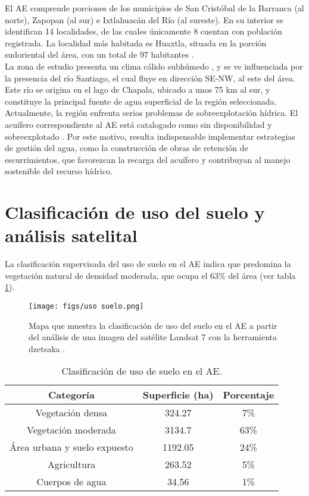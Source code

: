 \documentclass[12pt,letterpaper]{article}
\begin{document}
El AE comprende porciones de los municipios de San Cristóbal de la Barranca (al norte), Zapopan (al sur) e Ixtlahuacán del Río (al sureste). En su interior se identifican 14 localidades, de las cuales únicamente 8 cuentan con población registrada. La localidad más habitada es Huaxtla, situada en la porción sudoriental del área, con un total de 97 habitantes \cite{6}.\\

La zona de estudio presenta un clima cálido subhúmedo \cite{1,2}, y se ve influenciada por la presencia del río Santiago, el cual fluye en dirección SE-NW, al este del área. Este río se origina en el lago de Chapala, ubicado a unos 75 km al sur, y constituye la principal fuente de agua superficial de la región seleccionada.\\

Actualmente, la región enfrenta serios problemas de sobreexplotación hídrica. El acuífero correspondiente al AE está catalogado como sin disponibilidad y sobreexplotado \cite{1}. Por este motivo, resulta indispensable implementar estrategias de gestión del agua, como la construcción de obras de retención de escurrimientos, que favorezcan la recarga del acuífero y contribuyan al manejo sostenible del recurso hídrico.

\section{Clasificación de uso del suelo y análisis satelital}

La clasificación supervisada del uso de suelo en el AE indica que predomina la vegetación natural de densidad moderada, que ocupa el 63\% del área (ver tabla \ref{tab:t1}).

\begin{figure}[H]
    \centering
    \texttt{[image: figs/uso suelo.png]}
    \caption{Mapa que muestra la clasificación de uso del suelo en el AE a partir del análisis de una imagen del satélite Landsat 7 con la herramienta dzetsaka \cite{7}.}
    \label{fig:uso}
\end{figure}

\begin{table}[H]
    \centering
    \begin{tabular}{c|c|c}
\hline
Categoría & Superficie (ha) & Porcentaje  \\ \hline
Vegetación densa & 324.27 & 7\% \\
Vegetación moderada & 3134.7 & 63\% \\
Área urbana y suelo expuesto\cite{4} & 1192.05 & 24\% \\
Agricultura & 263.52 & 5\% \\
Cuerpos de agua & 34.56 & 1\% \\ \hline
    \end{tabular}
    \caption{Clasificación de uso de suelo en el AE.}
    \label{tab:t1}
\end{table}
\end{document}

